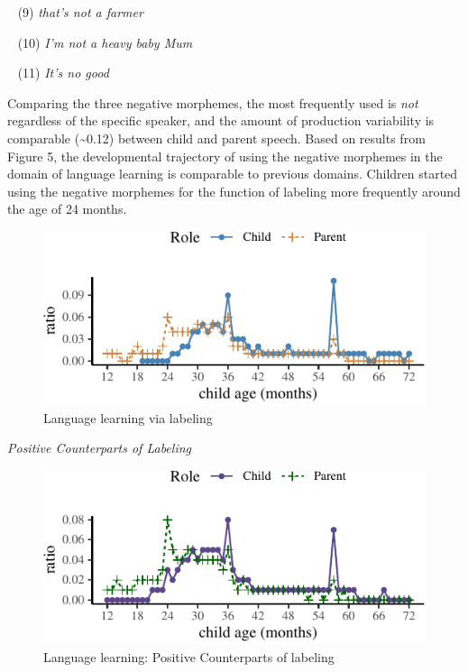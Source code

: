 \documentclass[
  english,
  man,floatsintext]{apa6}
\begin{document}
~
(9) \emph{that's not a farmer}

~
(10) \emph{I'm not a heavy baby Mum}

~
(11) \emph{It's no good}

Comparing the three negative morphemes, the most frequently used is \emph{not} regardless of the specific speaker, and the amount of production variability is comparable (\textasciitilde0.12) between child and parent speech. Based on results from Figure 5, the developmental trajectory of using the negative morphemes in the domain of language learning is comparable to previous domains. Children started using the negative morphemes for the function of labeling more frequently around the age of 24 months.

\begin{figure}[H]

{\centering \includegraphics{neg_combos_full_files/figure-latex/learning-1} 

}

\caption{Language learning via labeling}\label{fig:learning}
\end{figure}

\emph{Positive Counterparts of Labeling}

\begin{figure}[H]

{\centering \includegraphics{neg_combos_full_files/figure-latex/poslearning-1} 

}

\caption{Language learning: Positive Counterparts of labeling}\label{fig:poslearning}
\end{figure}
\end{document}

